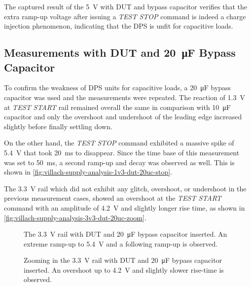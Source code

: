The captured result of the  \SI{5}{\volt} with \ac{DUT} and bypass capacitor
verifies that the extra ramp-up voltage after issuing a \emph{TEST STOP} command
is indeed a charge injection phenomenon, indicating that the \ac{DPS} is unfit
for capacitive loads.

\subsection{Measurements with \acs{DUT} and \SI{20}{\micro\farad}
Bypass Capacitor}
\label{subsec:onsite-measurements-added-20uc-capacitance}

To confirm the weakness of \ac{DPS} units for capacitive loads, a
\SI{20}{\micro\farad} bypass capacitor was used and the measurements were
repeated.
The reaction of \SI{1.3}{\volt} at \emph{TEST START} rail remained overall the
same in comparison with \SI{10}{\micro\farad} capacitor and only the
overshoot and undershoot of the leading edge increased slightly before finally
settling down.

On the other hand, the \emph{TEST STOP} command exhibited a massive
spike of \SI{5.4}{\volt} that took \SI{20}{\milli\second} to disappear.
Since the time base of this measurement was set to
\SI{50}{\milli\second}, a second ramp-up and decay was observed as well.
This is shown in \autoref{fig:villach-supply-analysis-1v3-dut-20uc-stop}.

The \SI{3.3}{\volt} rail which did not exhibit any
glitch, overshoot, or undershoot in the previous measurement cases, showed an
overshoot at the \emph{TEST START} command with an amplitude of \SI{4.2}{\volt}
and slightly longer rise time,
as shown in \autoref{fig:villach-supply-analysis-3v3-dut-20uc-zoom}.

\begin{figure}[h!]
    \centering
    \caption[\SI{1.3}{\volt} Rail at \emph{TEST STOP} with \acs{DUT}
    and \SI{20}{\micro\farad} capacitor]{
        The \SI{3.3}{\volt} rail with \acs{DUT} and
        \SI{20}{\micro\farad} bypass capacitor inserted.
        An extreme ramp-up to \SI{5.4}{\volt} and
        a following ramp-up is observed.
    }
    \label{fig:villach-supply-analysis-1v3-dut-20uc-stop}
\end{figure}

\begin{figure}[h!]
    \centering
    \caption[\SI{3.3}{\volt} Rail at \emph{TEST START} with \acs{DUT}
    and \SI{20}{\micro\farad} capacitor]{
        Zooming in the \SI{3.3}{\volt} rail with \acs{DUT} and
        \SI{20}{\micro\farad} bypass capacitor inserted.
        An overshoot up to \SI{4.2}{\volt} and
        slightly slower rise-time is observed.
    }
    \label{fig:villach-supply-analysis-3v3-dut-20uc-zoom}
\end{figure}

